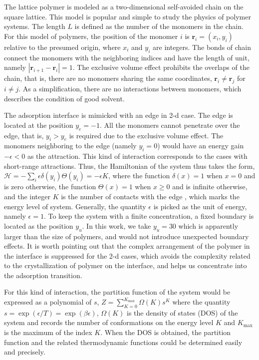 \documentclass[aps,pre,twocolumn,showpacs,preprintnumbers,amsmath,amssymb]{revtex4-1}
\begin{document}

The lattice polymer is modeled as a two-dimensional self-avoided chain
on the square lattice. This model is popular and simple to study
the physics of polymer systems. The length $L$ is defined as the number of the
monomers in the chain. For this model of polymers, the position
of the monomer $i$ is ${\mathbf r}_i=(x_i,y_i)$ relative to the presumed
origin, where $x_i$ and $y_i$ are integers. The bonds of chain connect
the monomers with the neighboring indices and have the length of unit,
namely $|{\mathbf r}_{i+1}-{\mathbf r}_i|=1$. The exclusive volume effect
prohibits the overlaps of the chain, that is, there are no monomers sharing
the same coordinates, ${\mathbf r}_i\neq {\mathbf r}_j$ for $i\neq j$.
As a simplification, there are no interactions between monomers, which
describes the condition of good solvent.

The adsorption interface is mimicked with an edge in 2-d case. The edge
is located at the position $y_e=-1$. All the monomers cannot penetrate
over the edge, that is, $y_i>y_e$ is required due to the exclusive volume
effect. The monomers neighboring to the edge (namely $y_i=0$) would have
an energy gain $-\epsilon<0$ as the attraction. This kind of interaction
corresponds to the cases with short-range attractions.
Thus, the Hamiltonian of the system thus takes the form,
${\mathcal H}=-\sum_i \epsilon \delta(y_i)\Theta(y_i) =-\epsilon K$,
where the function $\delta(x)=1$ when $x=0$ and is zero otherwise, the
function $\Theta(x)=1$ when $x\ge 0$ and is infinite otherwise, and the
integer $K$ is the number of contacts with the edge , which marks the
energy level of system. Generally, the quantity $\epsilon$ is picked
as the unit of energy, namely $\epsilon=1$.
To keep the system with a finite concentration, a fixed boundary
is located as the position $y_u$. In this work, we take $y_u=30$
which is apparently larger than the size of polymers, and would
not introduce unexpected boundary effects.
It is worth pointing out that the complex arrangement of the polymer
in the interface is suppressed for the 2-d cases, which
avoids the complexity related to the crystallization of polymer on
the interface, and helps us concentrate into the adsorption
transition.

For this kind of interaction, the partition function of the system would be
expressed as a polynomial of $s$, $Z=\sum_{K=0}^{K_{\text{max}}} \Omega(K) s^K$
where the quantity $s=\exp(\epsilon/T)=\exp(\beta\epsilon)$, $\Omega(K)$ is
the density of states (DOS) of the system and records the number
of conformations on the energy level $K$ and $K_{\text{max}}$ is the
maximum of the index $K$. When the DOS is obtained, the partition function
and the related thermodynamic functions could be determined easily and precisely.
\end{document}
